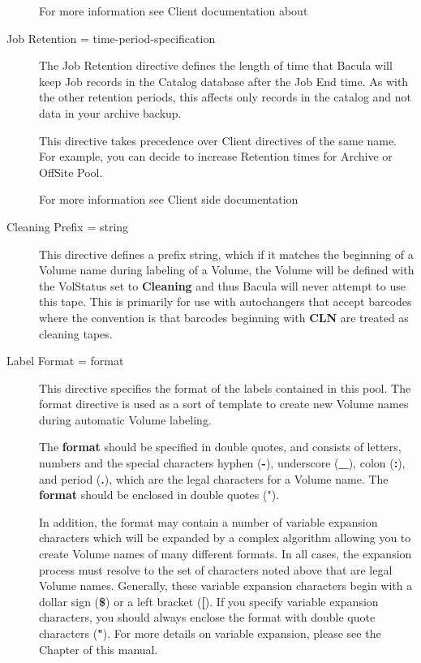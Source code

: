 \begin{description}
   For more information see Client documentation about

\item [Job Retention = \lt{}time-period-specification\gt{}]

   The Job Retention directive defines the length of time that Bacula will keep
   Job records in the Catalog database after the Job End time.  As with the
   other retention periods, this affects only records in the catalog and not
   data in your archive backup.

   This directive takes precedence over Client directives of the same name.
   For example, you can decide to increase Retention times for Archive or
   OffSite Pool.

   For more information see Client side documentation

\item [Cleaning Prefix = \lt{}string\gt{}]
   This directive defines a prefix string, which if it matches the
   beginning of a Volume name during labeling of a Volume, the Volume will
   be defined with the VolStatus set to {\bf Cleaning} and thus Bacula will
   never attempt to use this tape.  This is primarily for use with
   autochangers that accept barcodes where the convention is that barcodes
   beginning with {\bf CLN} are treated as cleaning tapes.

\label{Label}
\item [Label Format = \lt{}format\gt{}]
   This directive specifies the format of the labels contained in this
   pool.  The format directive is used as a sort of template to create new
   Volume names during automatic Volume labeling.

   The {\bf format} should be specified in double quotes, and consists of
   letters, numbers and the special characters hyphen ({\bf -}), underscore
   ({\bf \_}), colon ({\bf :}), and period ({\bf .}), which are the legal
   characters for a Volume name.  The {\bf format} should be enclosed in
   double quotes (").

   In addition, the format may contain a number of variable expansion
   characters which will be expanded by a complex algorithm allowing you to
   create Volume names of many different formats.  In all cases, the
   expansion process must resolve to the set of characters noted above that
   are legal Volume names.  Generally, these variable expansion characters
   begin with a dollar sign ({\bf \$}) or a left bracket ({\bf [}).  If you
   specify variable expansion characters, you should always enclose the
   format with double quote characters ({\bf "}).  For more details on
   variable expansion, please see the  Chapter of this manual.


\end{description}
